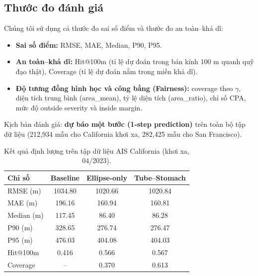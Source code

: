 \documentclass{IEEEtran}
\begin{document}
\subsection{Thước đo đánh giá}
Chúng tôi sử dụng cả thước đo sai số điểm và thước đo an toàn--khả dĩ:
\begin{itemize}
  \item \textbf{Sai số điểm:} RMSE, MAE, Median, P90, P95.
  \item \textbf{An toàn--khả dĩ:} Hit@100m (tỉ lệ dự đoán trong bán kính 100 m quanh quỹ đạo thật), Coverage (tỉ lệ dự đoán nằm trong miền khả dĩ).
  \item \textbf{Độ tương đồng hình học và công bằng (Fairness):} 
  coverage theo $\gamma$, diện tích trung bình (area\_mean), 
  tỷ lệ diện tích (area\_ratio), chỉ số CPA, mức độ outside severity và inside margin.
\end{itemize}

Kịch bản đánh giá: \textbf{dự báo một bước (1-step prediction)} 
trên toàn bộ tập dữ liệu (212{,}934 mẫu cho California khơi xa, 
282{,}425 mẫu cho San Francisco).


\begin{table}[H]
\centering
\renewcommand{\arraystretch}{1.2}
\caption{Kết quả định lượng trên tập dữ liệu AIS California (khơi xa, 04/2023).}
\label{tab:results-california}
\begin{tabular}{l S[table-format=4.2] S[table-format=4.2] S[table-format=4.2]}
\toprule
Chỉ số & {Baseline} & {Ellipse-only} & {Tube--Stomach} \\
\midrule
RMSE (m)    & 1034.80 & 1020.66 & 1020.84 \\
MAE (m)     &  196.16 &  160.94 &  160.81 \\
Median (m)  &  117.45 &   86.40 &   86.28 \\
P90 (m)     &  328.65 &  276.74 &  276.47 \\
P95 (m)     &  476.03 &  404.08 &  404.03 \\
Hit@100m    &    0.416 &   0.566 &   0.567 \\
Coverage    & {--}    &   0.370 &   0.613 \\
\bottomrule
\end{tabular}
\end{table}
\end{document}
